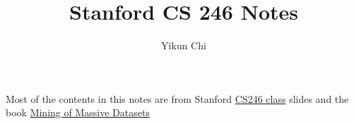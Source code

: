 \documentclass{book}
\title{Stanford CS 246 Notes}
\author{Yikun Chi}
\begin{document}
\maketitle
Most of the contents in this notes are from Stanford \href{http://web.stanford.edu/class/cs246/index.html}{CS246 class} slides and the book \href{http://www.mmds.org/}{Mining of Massive Datasets}

\tableofcontents 
















\end{document}

